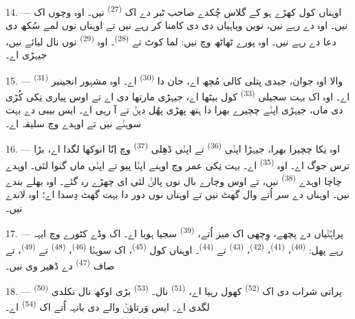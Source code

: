 14. --- اوہناں کول کھڑے ہو کے گلاس چُکدے صاحب ٹبر دے اک 
\textsuperscript{(27)} نیں۔ اوہ  وچوں اک نیں۔ اوہ
 دے رہے نیں، نویں ویاہیاں دی  دی کامنا کر رہے نیں تے
اوہناں نوں لمے سُکھ دی دعا دے رہے نیں۔ اوہ پورے ٹھاٹھ وچ نیں: لما کوٹ تے
 \textsuperscript{(28)}۔ اوہ 
\textsuperscript{(29)} نوں نال لیائے نیں، جیہڑی  اے۔

15. ---  \textsuperscript{(31)} والا اوہ جوان، جیدی پتلی کالی مُچھ
اے، جان دا  \textsuperscript{(30)} اے۔ اوہ مشہور انجینیر اے۔ اوہ
اک بہت سجیلی  \textsuperscript{(33)} کول بیٹھا اے، جیہڑی مارتھا دی
 اے تے اوس پیاری نِکی کُڑی دی ماں، جیہڑی اپݨے چچیرے بھرا دا ہتھ
پھڑی پھُل دیݨ تے   آ رہی اے۔ ایس بیبی دے
 بہت سوہݨے نیں تے اوہدے  وچ سلیقہ اے۔

16. --- اوہ نِکا چچیرا بھرا، جیہڑا اپݨی  \textsuperscript{(36)} تے
اپݨی ڈھِلی  \textsuperscript{(37)} وچ اِنّا انوکھا لگدا اے، بڑا ترس
جوگ اے۔ اوہ  \textsuperscript{(35)} اے۔ بہت نِکی عمر وچ اوہنے اپݨا
پیو تے اپݨی ماں گنوا لئی۔ اوہدے چاچا اوہدے  \textsuperscript{(38)}
نیں، تے اوس وچارے بال نوں پالݨ لئی ای چھڑے رہ گئے۔ اوہ بھلے بندے نیں۔ اوہناں دے
سر اُتے وال گھٹ نیں تے اوہناں نوں دور دا بہت گھٹ دِسدا اے؛ اوہ 
لاندے نیں۔

\VUsaut{2.4mm}
\VUsaut{3.0mm}

17. --- پراہُݨیاں دے پچھے،  وِچھی اک میز اُتے، 
\textsuperscript{(39)} سجیا ہویا اے۔ اک وڈے کٹورے وچ ایہہ رہے پھل:
 \textsuperscript{(40)}،  \textsuperscript{(41)}،
 \textsuperscript{(42)}،  \textsuperscript{(43)} تے
 \textsuperscript{(44)}۔ اوہناں کول 
\textsuperscript{(45)}، اک سوہݨا  \textsuperscript{(46)}،
 \textsuperscript{(48)} تے 
\textsuperscript{(49)}، تے صاف  \textsuperscript{(47)} دے ڈھیر وی
نیں۔

18. ---  \textsuperscript{(50)} پرانی شراب دی اک
 \textsuperscript{(52)} کھول رہیا اے، 
\textsuperscript{(51)} نال۔  \textsuperscript{(53)} بڑی اوکھ نال نکلدی
لگدی اے۔ ایس وَرتاؤݨ والے دی بانہہ اُتے اک  \textsuperscript{(54)}
اے۔

